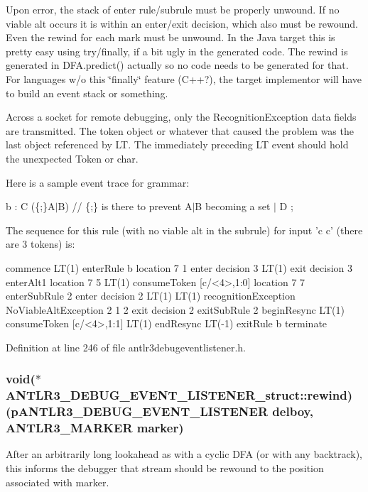 Upon error, the stack of enter rule/subrule must be properly unwound. If no viable alt occurs it is within an enter/exit decision, which also must be rewound. Even the rewind for each mark must be unwound. In the Java target this is pretty easy using try/finally, if a bit ugly in the generated code. The rewind is generated in D\-F\-A.\-predict() actually so no code needs to be generated for that. For languages w/o this \char`\"{}finally\char`\"{} feature (C++?), the target implementor will have to build an event stack or something.

Across a socket for remote debugging, only the Recognition\-Exception data fields are transmitted. The token object or whatever that caused the problem was the last object referenced by L\-T. The immediately preceding L\-T event should hold the unexpected Token or char.

Here is a sample event trace for grammar\-:

b \-: C (\{;\}A$\vert$\-B) // \{;\} is there to prevent A$\vert$\-B becoming a set $\vert$ D ;

The sequence for this rule (with no viable alt in the subrule) for input 'c c' (there are 3 tokens) is\-: \begin{DoxyVerb}        commence
        LT(1)
        enterRule b
        location 7 1
        enter decision 3
        LT(1)
        exit decision 3
        enterAlt1
        location 7 5
        LT(1)
        consumeToken [c/<4>,1:0]
        location 7 7
        enterSubRule 2
        enter decision 2
        LT(1)
        LT(1)
        recognitionException NoViableAltException 2 1 2
        exit decision 2
        exitSubRule 2
        beginResync
        LT(1)
        consumeToken [c/<4>,1:1]
        LT(1)
        endResync
        LT(-1)
        exitRule b
        terminate\end{DoxyVerb}
 

Definition at line 246 of file antlr3debugeventlistener.\-h.

\hypertarget{struct_a_n_t_l_r3___d_e_b_u_g___e_v_e_n_t___l_i_s_t_e_n_e_r__struct_a75107200ac78d7991c21b1b303144dff}{
\subsubsection[{rewind}]{\setlength{\rightskip}{0pt plus 5cm}void($\ast$ A\-N\-T\-L\-R3\-\_\-\-D\-E\-B\-U\-G\-\_\-\-E\-V\-E\-N\-T\-\_\-\-L\-I\-S\-T\-E\-N\-E\-R\-\_\-struct\-::rewind)({\bf p\-A\-N\-T\-L\-R3\-\_\-\-D\-E\-B\-U\-G\-\_\-\-E\-V\-E\-N\-T\-\_\-\-L\-I\-S\-T\-E\-N\-E\-R} delboy, {\bf A\-N\-T\-L\-R3\-\_\-\-M\-A\-R\-K\-E\-R} marker)}}\label{struct_a_n_t_l_r3___d_e_b_u_g___e_v_e_n_t___l_i_s_t_e_n_e_r__struct_a75107200ac78d7991c21b1b303144dff}
After an arbitrarily long lookahead as with a cyclic D\-F\-A (or with any backtrack), this informs the debugger that stream should be rewound to the position associated with marker. 

